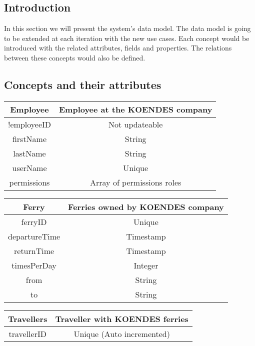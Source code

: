 
\subsection{Introduction}
In this section we will present the system's data model. The data model is going to be extended at each iteration with the new use cases. Each concept would be introduced with the related attributes, fields and properties. The relations between these concepts would also be defined.
\subsection{Concepts and their attributes}
\begin{table}[H]
\begin{tabular}{|c|c}
\cline{1-1}
Employee & Employee at the KOENDES company \\ \hline
!employeeID & Not updateable \\ firstName & String \\ lastName & String \\ userName & Unique \\ permissions & Array of permissions roles\\\hline
\end{tabular}
\end{table}

\begin{table}[H]
\begin{tabular}{|c|c}
\cline{1-1}
Ferry & Ferries owned by KOENDES company \\ \hline
ferryID & Unique \\ departureTime & Timestamp \\ returnTime & Timestamp \\ timesPerDay & Integer \\ from & String \\ to & String \\\hline
\end{tabular}
\end{table}

\begin{table}[H]
\begin{tabular}{|c|c}
\cline{1-1}
Travellers & Traveller with KOENDES ferries \\ \hline
travellerID & Unique (Auto incremented) \\ \hline
\end{tabular}
\end{table}


